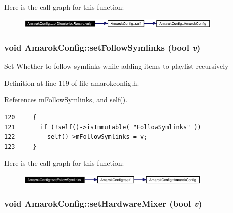 Here is the call graph for this function:\begin{figure}[H]
\begin{center}
\leavevmode
\includegraphics[width=280pt]{classAmarokConfig_AmarokConfige31_cgraph}
\end{center}
\end{figure}
\subsubsection{\setlength{\rightskip}{0pt plus 5cm}void Amarok\-Config::set\-Follow\-Symlinks (bool {\em v})\hspace{0.3cm}{\tt  [inline, static]}}\label{classAmarokConfig_AmarokConfige11}


Set Whether to follow symlinks while adding items to playlist recursively 

Definition at line 119 of file amarokconfig.h.

References m\-Follow\-Symlinks, and self().



\footnotesize\begin{verbatim}120     {
121       if (!self()->isImmutable( "FollowSymlinks" ))
122         self()->mFollowSymlinks = v;
123     }
\end{verbatim}\normalsize 


Here is the call graph for this function:\begin{figure}[H]
\begin{center}
\leavevmode
\includegraphics[width=265pt]{classAmarokConfig_AmarokConfige11_cgraph}
\end{center}
\end{figure}
\subsubsection{\setlength{\rightskip}{0pt plus 5cm}void Amarok\-Config::set\-Hardware\-Mixer (bool {\em v})\hspace{0.3cm}{\tt  [inline, static]}}\label{classAmarokConfig_AmarokConfige53}


